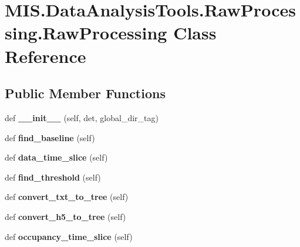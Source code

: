 \hypertarget{classMIS_1_1DataAnalysisTools_1_1RawProcessing_1_1RawProcessing}{}\section{M\+I\+S.\+Data\+Analysis\+Tools.\+Raw\+Processing.\+Raw\+Processing Class Reference}
\label{classMIS_1_1DataAnalysisTools_1_1RawProcessing_1_1RawProcessing}
\subsection*{Public Member Functions}
\begin{DoxyCompactItemize}
\item 
\mbox{\label{classMIS_1_1DataAnalysisTools_1_1RawProcessing_1_1RawProcessing_a1c43cd6917e26e06066294df557cdf1e}} 
def {\bfseries \+\_\+\+\_\+init\+\_\+\+\_\+} (self, det, global\+\_\+dir\+\_\+tag)
\item 
\mbox{\label{classMIS_1_1DataAnalysisTools_1_1RawProcessing_1_1RawProcessing_aac970b4fb74fc5f19959a0168df66e0f}} 
def {\bfseries find\+\_\+baseline} (self)
\item 
\mbox{\label{classMIS_1_1DataAnalysisTools_1_1RawProcessing_1_1RawProcessing_a612f13602e6de1c71326e3c0f8f1dc02}} 
def {\bfseries data\+\_\+time\+\_\+slice} (self)
\item 
\mbox{\label{classMIS_1_1DataAnalysisTools_1_1RawProcessing_1_1RawProcessing_a79dcb57336420036e2e6b75bb69864cc}} 
def {\bfseries find\+\_\+threshold} (self)
\item 
\mbox{\label{classMIS_1_1DataAnalysisTools_1_1RawProcessing_1_1RawProcessing_a8e7af03000eea33e3bca0b4547f5cac7}} 
def {\bfseries convert\+\_\+txt\+\_\+to\+\_\+tree} (self)
\item 
\mbox{\label{classMIS_1_1DataAnalysisTools_1_1RawProcessing_1_1RawProcessing_a488f71cb8beae10730db7fd9bfdabd99}} 
def {\bfseries convert\+\_\+h5\+\_\+to\+\_\+tree} (self)
\item 
\mbox{\label{classMIS_1_1DataAnalysisTools_1_1RawProcessing_1_1RawProcessing_ac00ece15d79907d27a234c4e09409851}} 
def {\bfseries occupancy\+\_\+time\+\_\+slice} (self)
\end{DoxyCompactItemize}
